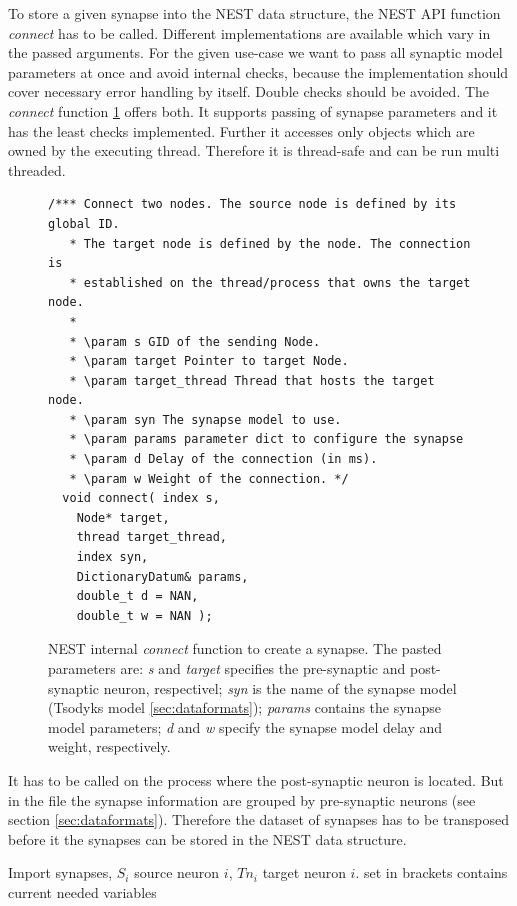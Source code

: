 To store a given synapse into the NEST data structure,
the NEST API function \emph{connect} has to be called.  
Different implementations are available which vary in the passed arguments.
For the given use-case we want to pass all synaptic model parameters at once and
avoid internal checks, because the implementation should cover necessary error handling by 
itself. Double checks should be avoided.
The \emph{connect} function \ref{code:connect} offers both.
It supports passing of synapse parameters and it has the least checks implemented.
Further it accesses only objects which are owned by the executing thread. 
Therefore it is thread-safe and can be run multi threaded.
\begin{figure}[ht!]
\begin{lstlisting}[style=cppcode]
/*** Connect two nodes. The source node is defined by its global ID.
   * The target node is defined by the node. The connection is
   * established on the thread/process that owns the target node.
   *
   * \param s GID of the sending Node.
   * \param target Pointer to target Node.
   * \param target_thread Thread that hosts the target node.
   * \param syn The synapse model to use.
   * \param params parameter dict to configure the synapse
   * \param d Delay of the connection (in ms).
   * \param w Weight of the connection. */
  void connect( index s,
    Node* target,
    thread target_thread,
    index syn,
    DictionaryDatum& params,
    double_t d = NAN,
    double_t w = NAN );
\end{lstlisting}
\caption{NEST internal \emph{connect} function to create a synapse. The pasted parameters are:
\emph{s} and \emph{target} specifies the pre-synaptic and post-synaptic neuron, respectivel;
\emph{syn} is the name of the synapse model (Tsodyks model \ref{sec:dataformats});
\emph{params} contains the synapse model parameters;
\emph{d} and \emph{w} specify the synapse model delay and weight, respectively.}
\label{code:connect}
\end{figure}
It has to be called on the process where the post-synaptic neuron is located.
But in the file the synapse information are grouped by pre-synaptic neurons (see section \ref{sec:dataformats}).
Therefore the dataset of synapses has to be transposed before it the synapses can be stored in the NEST data structure.
\begin{algorithm}[ht!]
	\caption{Import synapses, $S_i$ source neuron $i$, $Tn_i$ target neuron $i$.
	set in brackets contains current needed variables}
\label{alg2}
\end{algorithm}
